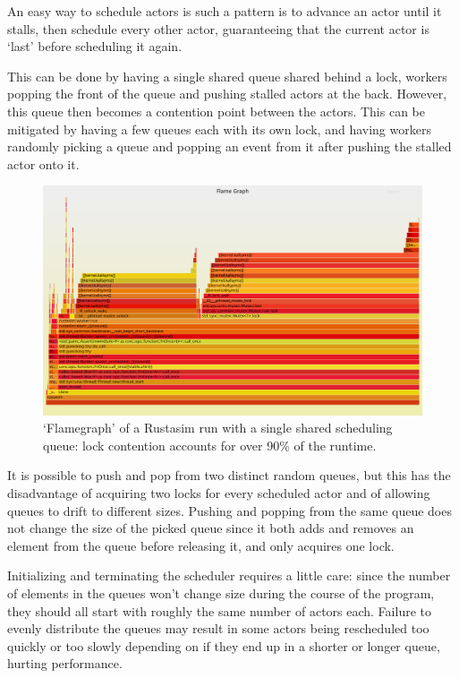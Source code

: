 An easy way to schedule actors is such a pattern is to advance an actor until it stalls, then schedule every other actor, guaranteeing that the current actor is `last' before scheduling it again.

This can be done by having a single shared queue shared behind a lock, workers popping the front of the queue and pushing stalled actors at the back.
However, this queue then becomes a contention point between the actors.
This can be mitigated by having a few queues each with its own lock, and having workers randomly picking a queue and popping an event from it after pushing the stalled actor onto it.

\begin{figure}[h]
    \centering
    \includegraphics[width=\textwidth]{flame-lock-one-heap}
    \caption{`Flamegraph' of a Rustasim run with a single shared scheduling queue: lock contention accounts for over 90\% of the runtime.} %
    \label{rustasim-lock-one-heap:fig}
\end{figure}

It is possible to push and pop from two distinct random queues, but this has the disadvantage of acquiring two locks for every scheduled actor and of allowing queues to drift to different sizes.
Pushing and popping from the same queue does not change the size of the picked queue since it both adds and removes an element from the queue before releasing it, and only acquires one lock.

Initializing and terminating the scheduler requires a little care: since the number of elements in the queues won't change size during the course of the program, they should all start with roughly the same number of actors each.
Failure to evenly distribute the queues may result in some actors being rescheduled too quickly or too slowly depending on if they end up in a shorter or longer queue, hurting performance.

